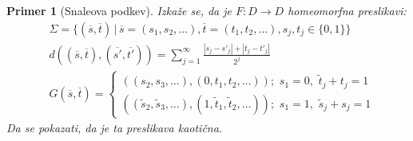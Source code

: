\documentclass{article}
\newtheorem{primer}{Primer}
\begin{document}
\begin{primer}[Snaleova podkev]
Izkaže se, da je $F:D \rightarrow D$ homeomorfna preslikavi:
\begin{align*}
&\Sigma = \{(\overline{s}, \overline{t}) \,|\, \overline{s} = (s_1, s_2, \dots), \overline{t} = (t_1, t_2, \dots), s_j, t_j \in \{0, 1\}\} \\
&d((\overline{s}, \overline{t}), (\overline{s'}, \overline{t'})) = \sum_{j=1}^\infty \frac{|s_j - s'_j| + |t_j - t'_j|}{2^j} \\
&G(\overline{s}, \overline{t}) = \left\{\begin{array}{l}
    \left((s_2, s_3, \dots), (0, t_1, t_2, \dots)\right);\,\, s_1 = 0,\,\, \tilde{t}_j + t_j = 1  \\
    \left((\tilde{s}_2, \tilde{s}_3, \dots), (1, \tilde{t}_1, \tilde{t}_2, \dots)\right);\,\, s_1 = 1,\,\, \tilde{s}_j + s_j = 1
    \end{array}\right.
\end{align*}
Da se pokazati, da je ta preslikava kaotična.
\end{primer}

%
%

\end{document}
